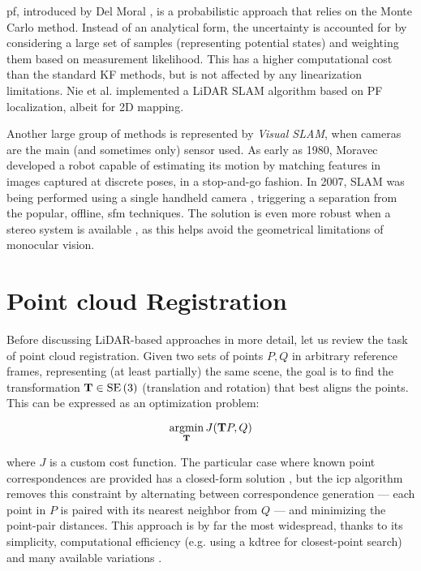 \acrfull{pf}, introduced by Del Moral \cite{del1997nonlinear}, is a probabilistic approach that relies on the Monte Carlo method. Instead of an analytical form, the uncertainty is accounted for by considering a large set of samples (representing potential states) and weighting them based on measurement likelihood. This has a higher computational cost than the standard KF methods, but is not affected by any linearization limitations. Nie et al. \cite{lcpf2020} implemented a LiDAR SLAM algorithm based on PF localization, albeit for 2D mapping.

Another large group of methods is represented by \emph{Visual SLAM}, when cameras are the main (and sometimes only) sensor used. As early as 1980, Moravec \cite{moravec1980obstacle} developed a robot capable of estimating its motion by matching features in images captured at discrete poses, in a stop-and-go fashion. In 2007, SLAM was being performed using a single handheld camera \cite{davison2007monoslam} \cite{klein2007parallel}, triggering a separation from the popular, offline, \gls{sfm} techniques. The solution is even more robust when a stereo system is available \cite{mei2011rslam}, as this helps avoid the geometrical limitations of monocular vision.

\section{Point cloud Registration}

Before discussing LiDAR-based approaches in more detail, let us review the task of point cloud registration. Given two sets of points $P, Q$ in arbitrary reference frames, representing (at least partially) the same scene, the goal is to find the transformation $\mathbf{T} \in \operatorname{SE}\left(3\right) $ (translation and rotation) that best aligns the points. This can be expressed as an optimization problem:

\begin{equation}\notag
    \underset{\mathbf{T}}{\operatorname{argmin}}\,J(\mathbf{T}P, Q)
\end{equation}

where $J$ is a custom cost function. The particular case where known point correspondences are provided has a closed-form solution \cite{arun1987leastsquares}, but the \acrfull{icp} algorithm \cite{besl1992method} removes this constraint by alternating between correspondence generation --- each point in $P$ is paired with its nearest neighbor from $Q$ --- and minimizing the point-pair distances. This approach is by far the most widespread, thanks to its simplicity, computational efficiency (e.g. using a \gls{kdtree} for closest-point search) and many available variations \cite{rusinkiewicz2001efficient} \cite{huang2021comprehensivesurveypointcloud}.

